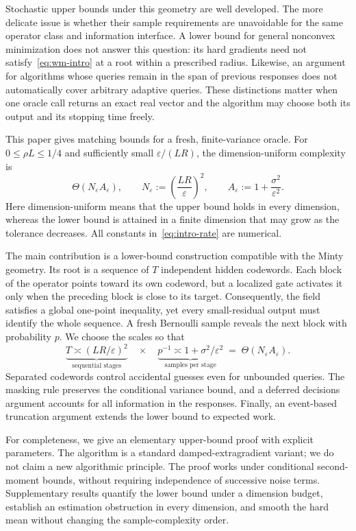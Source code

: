 \documentclass[11pt,a4paper]{article}
\newcommand{\eps}{\varepsilon}
\theoremstyle{definition}
\theoremstyle{remark}
\begin{document}
Stochastic upper bounds under this geometry are well developed. The more
delicate issue is whether their sample requirements are unavoidable for the
same operator class and information interface. A lower bound for general
nonconvex minimization does not answer this question: its hard gradients need
not satisfy~\eqref{eq:wm-intro} at a root within a prescribed radius. Likewise,
an argument for algorithms whose queries remain in the span of previous
responses does not automatically cover arbitrary adaptive queries. These
distinctions matter when one oracle call returns an exact real vector and
the algorithm may choose both its output and its stopping time freely.

This paper gives matching bounds for a fresh, finite-variance oracle. For
$0\le\rho L\le1/4$ and sufficiently small $\eps/(LR)$, the
dimension-uniform complexity is
\begin{equation}\label{eq:intro-rate}
 \Theta(N_\eps A_\eps),\qquad
 N_\eps:=\left(\frac{LR}{\eps}\right)^2,
 \qquad A_\eps:=1+\frac{\sigma^2}{\eps^2}.
\end{equation}
Here dimension-uniform means that the upper bound holds in every dimension,
whereas the lower bound is attained in a finite dimension that may grow as
the tolerance decreases. All constants in~\eqref{eq:intro-rate} are numerical.

The main contribution is a lower-bound construction compatible with the
Minty geometry. Its root is a sequence of $T$ independent hidden codewords.
Each block of the operator points toward its own codeword, but a localized
gate activates it only when the preceding block is close to its target.
Consequently, the field satisfies a global one-point inequality, yet every
small-residual output must identify the whole sequence. A fresh Bernoulli
sample reveals the next block with probability $p$. We choose the scales so
that
\[
 \underbrace{T\asymp (LR/\eps)^2}_{\text{sequential stages}}
 \quad\times\quad
 \underbrace{p^{-1}\asymp1+\sigma^2/\eps^2}_{\text{samples per stage}}
 \;=\;\Theta(N_\eps A_\eps).
\]
Separated codewords control accidental guesses even for unbounded queries.
The masking rule preserves the conditional variance bound, and a deferred
decisions argument accounts for all information in the responses. Finally,
an event-based truncation argument extends the lower bound to expected work.

For completeness, we give an elementary upper-bound proof with explicit
parameters. The algorithm is a standard damped-extragradient variant; we do
not claim a new algorithmic principle. The proof works under conditional
second-moment bounds, without requiring independence of successive noise
terms. Supplementary results quantify the lower bound under a dimension
budget, establish an estimation obstruction in every dimension, and smooth
the hard mean without changing the sample-complexity order.
\end{document}
